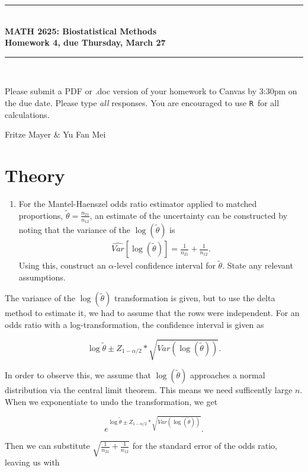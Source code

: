 \documentclass{article}
\newcommand{\HRule}{\rule{\linewidth}{0.5mm}}
\newcommand{\R}{\texttt{R}}
\begin{document}
	\begin{center}
		\HRule \\[0.1cm]
		\vspace{0.1cm}
		{ \LARGE \bfseries MATH 2625: Biostatistical Methods\\[0.5cm] Homework 4, due Thursday, March 27 } \\[0.1cm]
		\HRule \\[0.1cm]
	\end{center}
	
		Please submit a PDF or .doc version of your homework to Canvas by 3:30pm on the due date. Please type \emph{all} responses. You are encouraged to use \R\ for all calculations.

		Fritze Mayer \& Yu Fan Mei
		
	\section*{Theory}
	\begin{enumerate}
		\item For the Mantel-Haenszel odds ratio estimator applied to matched proportions, $\tilde{\theta} = \frac{n_{21}}{n_{12}}$, an estimate of the uncertainty can be constructed by noting that the variance of the $\log(\tilde{\theta})$ is
		\begin{align*}
			\widehat{Var}\left[\log(\tilde{\theta})\right] = \frac{1}{n_{21}} + \frac{1}{n_{12}}.
		\end{align*}
		Using this, construct an $\alpha$-level confidence interval for $\tilde{\theta}$. State any relevant assumptions.
	\end{enumerate}

	The variance of the $\log(\tilde{\theta})$ transformation is given, but to use the delta method to estimate it, we had to assume that the rows were independent. For an odds ratio with a log-transformation, the confidence interval is given as

	$$\log{\tilde{\theta} } \pm Z_{1 - \alpha/2} * \sqrt{Var(\log(\tilde{\theta})) }.$$

	In order to observe this, we assume that $\log(\tilde{\theta})$ approaches a normal distribution via the central limit theorem. This means we need sufficently large $n$. When we exponentiate to undo the transformation, we get

	$$e^{\log{\tilde{\theta} } \pm Z_{1 - \alpha/2} * \sqrt{Var(\log(\tilde{\theta})) }}.$$

	Then we can substitute $\sqrt{\frac{1}{n_{21}} + \frac{1}{n_{12}}}$ for the standard error of the odds ratio, leaving us with 
\end{document}
